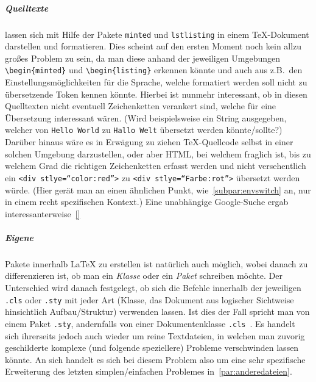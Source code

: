 \subparagraph*{Quelltexte} lassen sich mit Hilfe der Pakete \texttt{minted} und \texttt{lstlisting} in einem \TeX{}-Dokument darstellen und formatieren. Dies scheint auf den ersten Moment noch kein allzu großes Problem zu sein, da man diese anhand der jeweiligen Umgebungen \verb|\begin{minted}| und \verb|\begin{listing}| erkennen könnte und auch aus z.B.\ den Einstellungsmöglichkeiten für die Sprache, welche formatiert werden soll nicht zu übersetzende Token kennen könnte. Hierbei ist nunmehr interessant, ob in diesen Quelltexten nicht eventuell Zeichenketten verankert sind, welche für eine Übersetzung interessant wären. (Wird beispielsweise ein String ausgegeben, welcher von \texttt{Hello World} zu \texttt{Hallo Welt} übersetzt werden könnte/sollte?) Darüber hinaus wäre es in Erwägung zu ziehen \TeX{}-Quellcode selbst in einer solchen Umgebung darzustellen, oder aber HTML, bei welchem fraglich ist, bis zu welchem Grad die richtigen Zeichenketten erfasst werden und nicht versehentlich ein \texttt{<div stlye=\enquote{color:red}>} zu \texttt{<div stlye=\enquote{Farbe:rot}>} übersetzt werden würde. (Hier gerät man an einen ähnlichen Punkt, wie~\ref{subpar:envswitch} an, nur in einem recht spezifischen Kontext.) Eine unabhängige Google-Suche ergab interessanterweise~\ref{}%

\subparagraph*{Eigene}Pakete innerhalb \LaTeX{} zu erstellen ist natürlich auch möglich, wobei danach zu differenzieren ist, ob man ein \textit{Klasse} oder ein \textit{Paket} schreiben möchte. Der Unterschied wird danach festgelegt, ob sich die Befehle innerhalb der jeweiligen \texttt{.cls} oder \texttt{.sty} mit jeder Art (Klasse, das Dokument aus logischer Sichtweise hinsichtlich Aufbau/Struktur) verwenden lassen. Ist dies der Fall spricht man von einem Paket \texttt{.sty}, andernfalls von einer Dokumentenklasse \texttt{.cls}~\citep{latex:documentation:clsguide}. Es handelt sich ihrerseits jedoch auch wieder um reine Textdateien, in welchen man zuvorig geschilderte komplexe (und folgende speziellere) Probleme verschwinden lassen könnte. An sich handelt es sich bei diesem Problem also um eine sehr spezifische Erweiterung des letzten simplen/einfachen Problemes in~\ref{par:anderedateien}.

